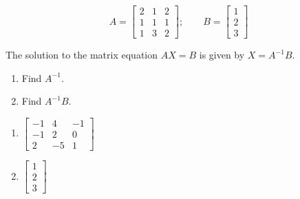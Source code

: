 \documentclass{article}
\newenvironment{solution}{\color{red}}{\color{black}}
\begin{document}
\begin{solution}
\[ A = \left[ \begin{array}{ccc}
2 & 1 & 2 \\
1 & 1 & 1 \\
1 & 3 & 2
\end{array} \right]; \qquad B = \left[ \begin{array}{ccc}
1 \\
2 \\
3 
\end{array} \right] \]
\end{solution}

The solution to the matrix equation $AX = B$ is given by $X = A^{-1}B$.

\begin{enumerate}
\item Find $A^{-1}$.
\item Find $A^{-1}B$.
\end{enumerate}

\begin{solution}
\begin{enumerate}
\item 
$\left[ \begin{array}{ccc}
-1 & 4 & -1 \\
-1 & 2 & 0 \\
2 & -5 & 1
\end{array} \right]$
\item 
$\left[ \begin{array}{ccc}
1 \\
2 \\
3 
\end{array} \right]$
\end{enumerate}
\end{solution}
\end{document}

